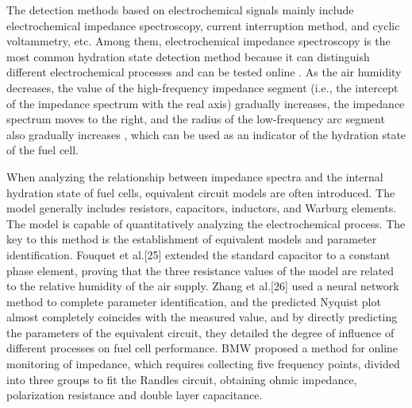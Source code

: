 The detection methods based on electrochemical signals mainly include electrochemical impedance spectroscopy, current interruption method, and cyclic voltammetry, etc. Among them, electrochemical impedance spectroscopy is the most common hydration state detection method because it can distinguish different electrochemical processes and can be tested online \cite{yousfisteinerDiagnosisPolymerElectrolyte2011,chenOperationCharacteristicsCarbon2015}.
As the air humidity decreases, the value of the high-frequency impedance segment (i.e., the intercept of the impedance spectrum with the real axis) gradually increases, the impedance spectrum moves to the right, and the radius of the low-frequency arc segment also gradually increases \cite{hussainiVisualizationQuantificationCathode2009,mocoteguy_study_2020,laribi_impedance_2016}, which can be used as an indicator of the hydration state of the fuel cell.
\par
When analyzing the relationship between impedance spectra and the internal hydration state of fuel cells, equivalent circuit models are often introduced. The model generally includes resistors, capacitors, inductors, and Warburg elements\cite{tangRecentProgressUse2020}. The model is capable of quantitatively analyzing the electrochemical process.  The key to this method is the establishment of equivalent models and parameter identification. Fouquet et al.[25] extended the standard capacitor to a constant phase element, proving that the three resistance values of the model are related to the relative humidity of the air supply. Zhang et al.[26] used a neural network method to complete parameter identification, and the predicted Nyquist plot almost completely coincides with the measured value, and by directly predicting the parameters of the equivalent circuit, they detailed the degree of influence of different processes on fuel cell performance. BMW proposed a method for online monitoring of impedance, which requires collecting five frequency points, divided into three groups to fit the Randles circuit, obtaining ohmic impedance, polarization resistance and double layer capacitance\cite{fouquetModelBasedPEM2006}.
